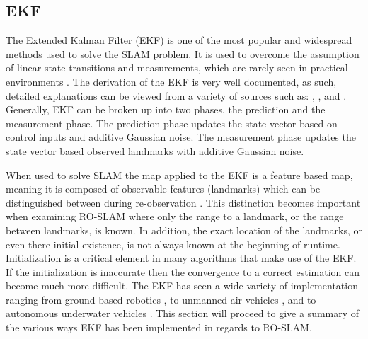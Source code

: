 \documentclass[conference]{IEEEtran}
\begin{document}
	\subsection{EKF}
	
	
	
	The Extended Kalman Filter (EKF) is one of the most popular and widespread methods used to solve the SLAM problem. It is used to overcome the assumption of linear state transitions and measurements, which are rarely seen in practical environments \cite{Thrun2002}. The derivation of the EKF is very well documented, as such, detailed explanations can be viewed from a variety of sources such as: \cite{Thrun2002}, \cite{Ribeiro2004}, and \cite{Haykin2001}. Generally, EKF can be broken up into two phases, the prediction and the measurement phase. The prediction phase updates the state vector based on control inputs and additive Gaussian noise. The measurement phase updates the state vector based observed landmarks with additive Gaussian noise.
	
	 When used to solve SLAM the map applied to the EKF is a feature based map, meaning it is composed of observable features (landmarks) which can be distinguished between during re-observation \cite{Thrun2002}. This distinction becomes important when examining RO-SLAM where only the range to a landmark, or the range between landmarks, is known. 
	 In addition, the exact location of the landmarks, or even there initial existence, is not always known at the beginning of runtime. Initialization is a critical element in many algorithms that make use of the EKF. If the initialization is inaccurate then the convergence to a correct estimation can become much more difficult. The EKF has seen a wide variety of implementation ranging from ground based robotics\cite{Djugash2008} \cite{Shue2017}, to unmanned air vehicles \cite{Fabresse2016}, and to autonomous underwater vehicles \cite{Olson2006}. This section will proceed to give a summary of the various ways EKF has been implemented in regards to RO-SLAM.
	
\end{document}
